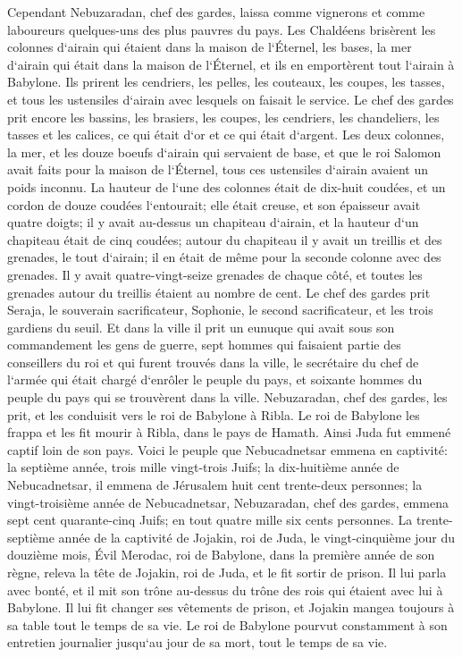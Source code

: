 \verse Cependant Nebuzaradan, chef des gardes, laissa comme vignerons et comme laboureurs quelques-uns des plus pauvres du pays. 
\verse Les Chaldéens brisèrent les colonnes d`airain qui étaient dans la maison de l`Éternel, les bases, la mer d`airain qui était dans la maison de l`Éternel, et ils en emportèrent tout l`airain à Babylone. 
\verse Ils prirent les cendriers, les pelles, les couteaux, les coupes, les tasses, et tous les ustensiles d`airain avec lesquels on faisait le service. 
\verse Le chef des gardes prit encore les bassins, les brasiers, les coupes, les cendriers, les chandeliers, les tasses et les calices, ce qui était d`or et ce qui était d`argent. 
\verse Les deux colonnes, la mer, et les douze boeufs d`airain qui servaient de base, et que le roi Salomon avait faits pour la maison de l`Éternel, tous ces ustensiles d`airain avaient un poids inconnu. 
\verse La hauteur de l`une des colonnes était de dix-huit coudées, et un cordon de douze coudées l`entourait; elle était creuse, et son épaisseur avait quatre doigts; 
\verse il y avait au-dessus un chapiteau d`airain, et la hauteur d`un chapiteau était de cinq coudées; autour du chapiteau il y avait un treillis et des grenades, le tout d`airain; il en était de même pour la seconde colonne avec des grenades. 
\verse Il y avait quatre-vingt-seize grenades de chaque côté, et toutes les grenades autour du treillis étaient au nombre de cent. 
\verse Le chef des gardes prit Seraja, le souverain sacrificateur, Sophonie, le second sacrificateur, et les trois gardiens du seuil. 
\verse Et dans la ville il prit un eunuque qui avait sous son commandement les gens de guerre, sept hommes qui faisaient partie des conseillers du roi et qui furent trouvés dans la ville, le secrétaire du chef de l`armée qui était chargé d`enrôler le peuple du pays, et soixante hommes du peuple du pays qui se trouvèrent dans la ville. 
\verse Nebuzaradan, chef des gardes, les prit, et les conduisit vers le roi de Babylone à Ribla. 
\verse Le roi de Babylone les frappa et les fit mourir à Ribla, dans le pays de Hamath. Ainsi Juda fut emmené captif loin de son pays. 
\verse Voici le peuple que Nebucadnetsar emmena en captivité: la septième année, trois mille vingt-trois Juifs; 
\verse la dix-huitième année de Nebucadnetsar, il emmena de Jérusalem huit cent trente-deux personnes; 
\verse la vingt-troisième année de Nebucadnetsar, Nebuzaradan, chef des gardes, emmena sept cent quarante-cinq Juifs; en tout quatre mille six cents personnes. 
\verse La trente-septième année de la captivité de Jojakin, roi de Juda, le vingt-cinquième jour du douzième mois, Évil Merodac, roi de Babylone, dans la première année de son règne, releva la tête de Jojakin, roi de Juda, et le fit sortir de prison. 
\verse Il lui parla avec bonté, et il mit son trône au-dessus du trône des rois qui étaient avec lui à Babylone. 
\verse Il lui fit changer ses vêtements de prison, et Jojakin mangea toujours à sa table tout le temps de sa vie. 
\verse Le roi de Babylone pourvut constamment à son entretien journalier jusqu`au jour de sa mort, tout le temps de sa vie. 
